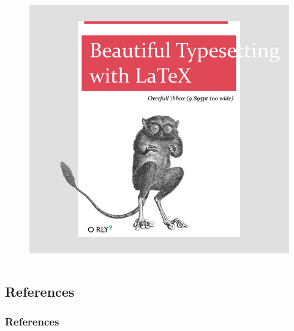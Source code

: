 \documentclass[compress]{beamer}
\begin{document}
\begin{frame}[Basic2]
\begin{columns}
\begin{column}{0.5\textwidth}
                \begin{figure}
                    \centering
                    \includegraphics[width=0.9\linewidth]{../figures/latex_typesetting}
                    \caption{}
                    \label{fig:latextypesetting}
                \end{figure}
            \end{column}
        \end{columns}
    \end{frame}
    


\subsection{References}
    \begin{frame}
            \frametitle{References}
            \nocite{*}
            \tiny
            
            
    \end{frame}
\end{document}
